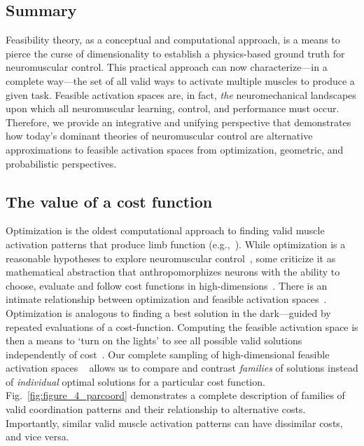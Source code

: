 \documentclass[letterpaper]{article}
\begin{document}
\subsection*{Summary}

Feasibility theory, as a conceptual and computational approach, is a means to pierce the curse of dimensionality to establish a physics-based ground truth for neuromuscular control. This practical approach can now characterize---in a complete way---the set of all valid ways to activate multiple muscles to produce a given task.
Feasible activation spaces are, in fact, \emph{the} neuromechanical landscapes upon which all neuromuscular learning, control, and performance must occur. Therefore, we provide an integrative and unifying perspective that demonstrates how today's dominant theories of neuromuscular control are alternative approximations to feasible activation spaces from optimization, geometric, and probabilistic perspectives.

\subsection*{The value of a cost function}

Optimization is the oldest computational approach to finding valid muscle activation patterns that produce limb function (e.g.,~\cite{Chao1978Graphical}).
While optimization is a reasonable hypotheses to explore neuromuscular control~\cite{todorov2002optimal}, some criticize it as mathematical abstraction that anthropomorphizes neurons with the ability to choose, evaluate and follow cost functions in high-dimensions~\cite{deRugy2012habitual,loeb2012optimal}.
There is an intimate relationship between optimization and feasible activation spaces~\cite{chvatal1983linear}. Optimization is analogous to finding a best solution in the dark---guided by repeated evaluations of a cost-function. Computing the feasible activation space is then a means to `turn on the lights' to see all possible valid solutions independently of cost~\cite{valero-cuevas2015fundamentals}. Our complete sampling of high-dimensional feasible activation spaces ~\cite{smith1984efficient,lovasz1999hit} allows us to compare and contrast \emph{families} of solutions instead of \emph{individual} optimal solutions for a particular cost function.
Fig.~\ref{fig:figure_4_parcoord} demonstrates a complete description of families of valid coordination patterns and their relationship to alternative costs. Importantly, similar valid muscle activation patterns can have dissimilar costs, and vice versa.
\end{document}
